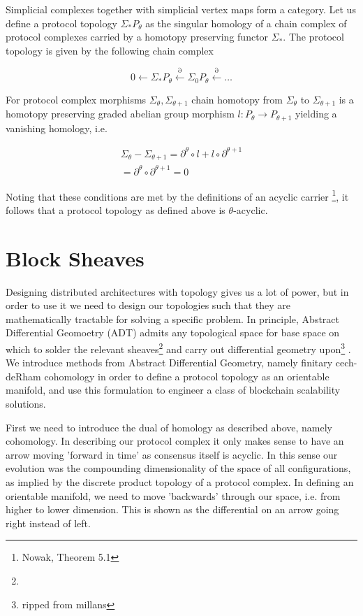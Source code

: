 \documentclass{article}
\begin{document}
Simplicial complexes together with simplicial vertex maps form a category. Let us define a protocol topology $\Sigma_{*}P_\theta$ as the singular homology of a chain complex of protocol complexes carried by a homotopy preserving functor $\Sigma_*$. The protocol topology is given by the following chain complex

\begin{equation} \label{eq1}
0 \leftarrow \Sigma_{*}P_\theta \xleftarrow{\partial} \Sigma_{0}P_\theta \xleftarrow{\partial} \dots
\end{equation} \label{eq1}

For protocol complex morphisms $\Sigma_\theta, \Sigma_{\theta+1}$ chain homotopy from $\Sigma_\theta$ to $\Sigma_{\theta+1}$ is a homotopy preserving graded abelian group morphism $l: P_{\theta} \rightarrow P_{\theta+1}$ yielding a vanishing homology, i.e. 

\begin{equation} \label{eq1}
\begin{split}
\Sigma_\theta - \Sigma_{\theta+1} =  \partial^{\theta}\circ l + l \circ \partial^{\theta+1} \\
= \partial^\theta \circ \partial^{\theta+1} = 0
\end{split}
\end{equation}

Noting that these conditions are met by the definitions of an acyclic carrier \footnote{Nowak, Theorem 5.1}, it follows that a protocol topology as defined above is $\theta$-acyclic.

\section{Block Sheaves}
Designing distributed architectures with topology gives us a lot of power, but in order to use it we need to design our topologies such that they are mathematically tractable for solving a specific problem. In principle, Abstract Differential Geomoetry (ADT) admits any topological space for base space on which to solder the relevant sheaves\footnote{} and carry out differential geometry upon\footnote{ripped from millans} . We introduce methods from Abstract Differential Geometry, namely finitary cech-deRham cohomology in order to define a protocol topology as an orientable manifold, and use this formulation to engineer a class of blockchain scalability solutions.

First we need to introduce the dual of homology as described above, namely cohomology. In describing our protocol complex it only makes sense to have an arrow moving 'forward in time' as consensus itself is acyclic. In this sense our evolution was the compounding dimensionality of the space of all configurations, as implied by the discrete product topology of a protocol complex. In defining an orientable manifold, we need to move 'backwards' through our  space, i.e. from higher to lower dimension. This is shown as the differential on an arrow going right instead of left.
\end{document}
